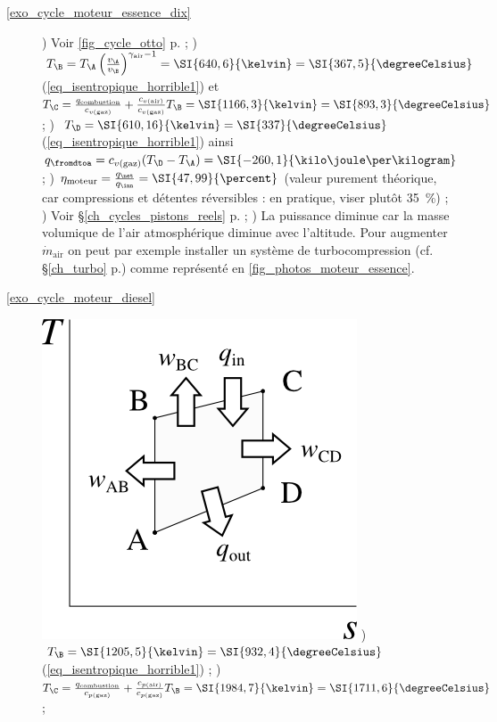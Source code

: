 \exercisesolutionpage
\titreresultats
	
	\begin{description}
		\item [\ref{exo_cycle_moteur_essence_dix}]
			) Voir \cref{fig_cycle_otto} p.\pageref{fig_cycle_otto} ;
	 		) $T_\B = T_\A \left(\frac{v_\A}{v_\B}\right)^{\gamma_\text{air} - 1} = \SI{640,6}{\kelvin} = \SI{367,5}{\degreeCelsius}$ (\ref{eq_isentropique_horrible1}) et $T_\C = \frac{q_\text{combustion}}{c_{v \text{(gaz)}}} + \frac{c_{v \text{(air)}}}{c_{v \text{(gaz)}}} T_\B = \SI{1166,3}{\kelvin} = \SI{893,3}{\degreeCelsius}$ ;
	 		) $T_\D = \SI{610,16}{\kelvin} = \SI{337}{\degreeCelsius}$ (\ref{eq_isentropique_horrible1}) ainsi $q_\fromdtoa = c_{v \text{(gaz)}} (T_\D - T_\A) = \SI{-260,1}{\kilo\joule\per\kilogram}$ ;
	 		) $\eta_\text{moteur} = \frac{q_\net}{q_\inn} = \SI{47,99}{\percent}$ (valeur purement théorique, car compressions et détentes réversibles : en pratique, viser plutôt \SI{35}{\percent}) ;
	 		) Voir \S\ref{ch_cycles_pistons_reels} p.\pageref{ch_cycles_pistons_reels} ;
	 		) La puissance diminue car la masse volumique de l’air atmosphérique diminue avec l’altitude. Pour augmenter $\dot m_\text{air}$ on peut par exemple installer un système de turbocompression (cf. \S\ref{ch_turbo} p.\pageref{ch_turbo}) comme représenté en \cref{fig_photos_moteur_essence}.
	 	\item [\ref{exo_cycle_moteur_diesel}]
	 		\includegraphics[width=\solutiondiagramwidth]{images/exo_sol_ts_diesel.png}
	 		) $T_\B = \SI{1205,5}{\kelvin} = \SI{932,4}{\degreeCelsius}$ (\ref{eq_isentropique_horrible1}) ;
	 		) $T_\C = \frac{q_\text{combustion}}{c_{p \text{(gaz)}}} + \frac{c_{p \text{(air)}}}{c_{p \text{(gaz)}}} T_\B = \SI{1984,7}{\kelvin} = \SI{1711,6}{\degreeCelsius}$ ;

\end{description}
